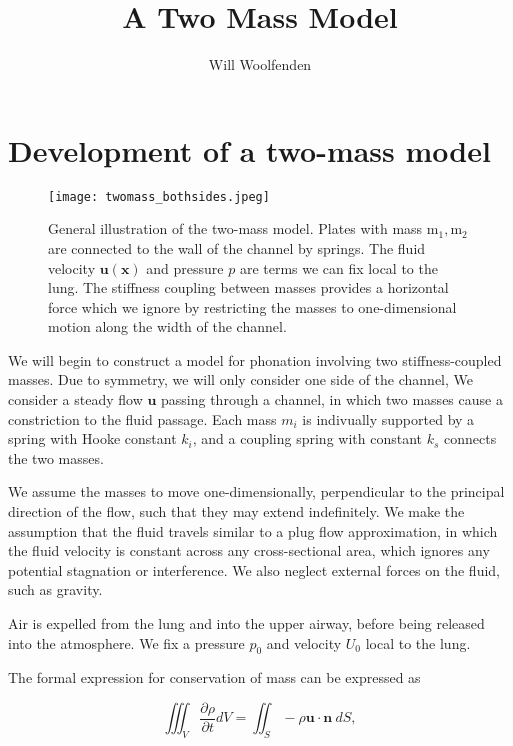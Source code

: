 \documentclass{article}
\begin{document}
\title{A Two Mass Model}
\author{Will Woolfenden}

\section{Development of a two-mass model}

\begin{figure}
    \centering
    \texttt{[image: twomass\_bothsides.jpeg]}
    \caption{General illustration of the two-mass model. Plates with mass $\mathrm{m_1},\mathrm{m_2}$ are connected to the wall of the channel by springs.
    The fluid velocity $\bm{u(x)}$ and pressure $p$ are terms we can fix local to the lung.
    The stiffness coupling between masses provides a horizontal force which we ignore by restricting the masses to one-dimensional motion along the width of the channel.}
    \label{fig:twomass_bothsides}
\end{figure}

We will begin to construct a model for phonation involving two stiffness-coupled masses.
Due to symmetry, we will only consider one side of the channel, 
We consider a steady flow $\mathbf{u}$ passing through a channel,
in which two masses cause a constriction to the fluid passage.
Each mass $m_i$ is indivually supported by a spring with Hooke constant $k_i$,
and a coupling spring with constant $k_s$ connects the two masses.

We assume the masses to move one-dimensionally, perpendicular to the principal direction of the flow,
such that they may extend indefinitely.
We make the assumption that the fluid travels similar to a plug flow approximation,
in which the fluid velocity is constant across any cross-sectional area, %
which ignores any potential stagnation or interference.
We also neglect external forces on the fluid, such as gravity.

Air is expelled from the lung and into the upper airway, before being released into the atmosphere.
We fix a pressure $p_0$ and velocity $U_0$ local to the lung.

The formal expression for conservation of mass can be expressed as

\begin{equation}
    \iiint_V \frac{\partial\rho}{\partial t}dV = \iint_S -\rho \bm{u\cdot n}~dS,
    \label{eqn:cons_mass_formal}
\end{equation}
\end{document}
